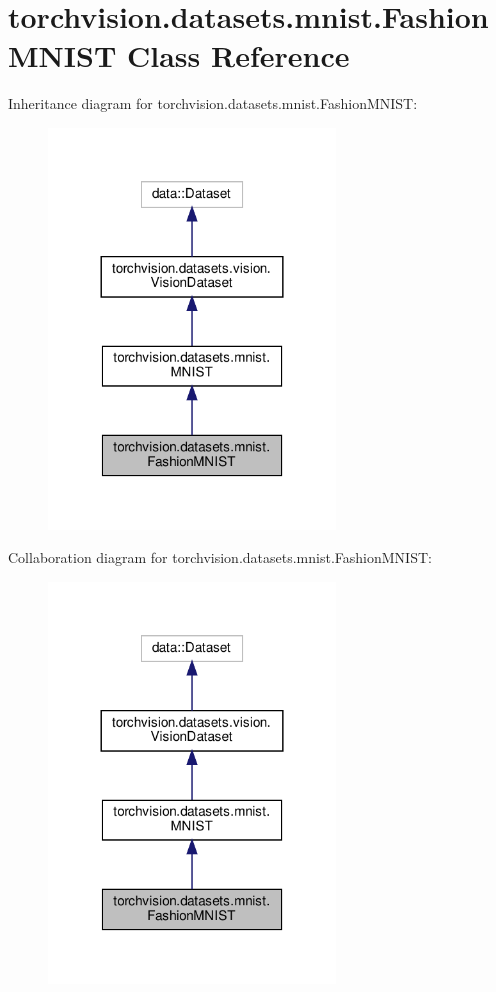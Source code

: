 \hypertarget{classtorchvision_1_1datasets_1_1mnist_1_1FashionMNIST}{}\section{torchvision.\+datasets.\+mnist.\+Fashion\+M\+N\+I\+ST Class Reference}
\label{classtorchvision_1_1datasets_1_1mnist_1_1FashionMNIST}


Inheritance diagram for torchvision.\+datasets.\+mnist.\+Fashion\+M\+N\+I\+ST\+:
\nopagebreak
\begin{figure}[H]
\begin{center}
\leavevmode
\includegraphics[width=216pt]{classtorchvision_1_1datasets_1_1mnist_1_1FashionMNIST__inherit__graph}
\end{center}
\end{figure}


Collaboration diagram for torchvision.\+datasets.\+mnist.\+Fashion\+M\+N\+I\+ST\+:
\nopagebreak
\begin{figure}[H]
\begin{center}
\leavevmode
\includegraphics[width=216pt]{classtorchvision_1_1datasets_1_1mnist_1_1FashionMNIST__coll__graph}
\end{center}
\end{figure}
